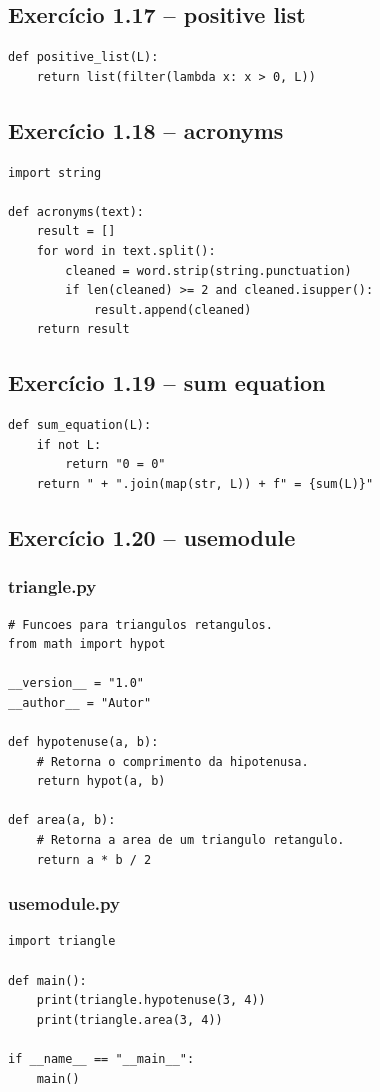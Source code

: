 \documentclass[11pt,a4paper]{article}
\begin{document}
\subsection*{Exercício 1.17 -- positive list}
\begin{solucao}
\begin{lstlisting}
def positive_list(L):
    return list(filter(lambda x: x > 0, L))
\end{lstlisting}
\end{solucao}

\subsection*{Exercício 1.18 -- acronyms}
\begin{solucao}
\begin{lstlisting}
import string

def acronyms(text):
    result = []
    for word in text.split():
        cleaned = word.strip(string.punctuation)
        if len(cleaned) >= 2 and cleaned.isupper():
            result.append(cleaned)
    return result
\end{lstlisting}
\end{solucao}

\subsection*{Exercício 1.19 -- sum equation}
\begin{solucao}
\begin{lstlisting}
def sum_equation(L):
    if not L:
        return "0 = 0"
    return " + ".join(map(str, L)) + f" = {sum(L)}"
\end{lstlisting}
\end{solucao}

\subsection*{Exercício 1.20 -- usemodule}
\subsubsection*{triangle.py}
\begin{solucao}
\begin{lstlisting}
# Funcoes para triangulos retangulos.
from math import hypot

__version__ = "1.0"
__author__ = "Autor"

def hypotenuse(a, b):
    # Retorna o comprimento da hipotenusa.
    return hypot(a, b)

def area(a, b):
    # Retorna a area de um triangulo retangulo.
    return a * b / 2
\end{lstlisting}
\end{solucao}

\subsubsection*{usemodule.py}
\begin{solucao}
\begin{lstlisting}
import triangle

def main():
    print(triangle.hypotenuse(3, 4))
    print(triangle.area(3, 4))

if __name__ == "__main__":
    main()
\end{lstlisting}
\end{solucao}
\end{document}
